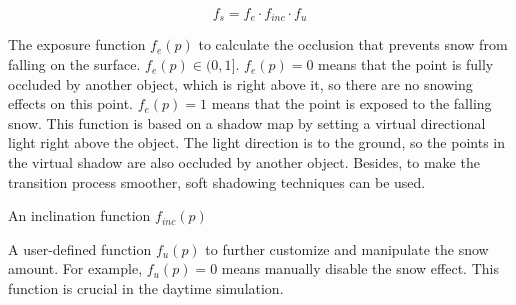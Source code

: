 \documentclass{article}
\begin{document}
\begin{itemize}
\[
  f_{s} = f_{e} \cdot f_{inc} \cdot f_{u}
\]

The exposure function \( f_{e}(p) \) to calculate the occlusion that prevents snow from falling on the surface. %
\( f_{e}(p) \in (0, 1] \). \( f_{e}(p)=0 \) means that the point is fully occluded by another object, which is right 
above it, so there are no snowing effects on this point. \( f_{e}(p)=1 \) means that the point is exposed to the falling
snow. This function is based on a shadow map by setting a virtual directional light right above the object. The light 
direction is to the ground, so the points in the virtual shadow are also occluded by another object. Besides, to make
the transition process smoother, soft shadowing techniques can be used.



An inclination function \( f_{inc}(p) \) 

A user-defined function \( f_{u}(p) \) to further customize and manipulate the snow amount. For example, 
\( f_{u}(p)=0 \) means manually disable the snow effect. This function is crucial in the daytime simulation.




\end{itemize}
\end{document}
